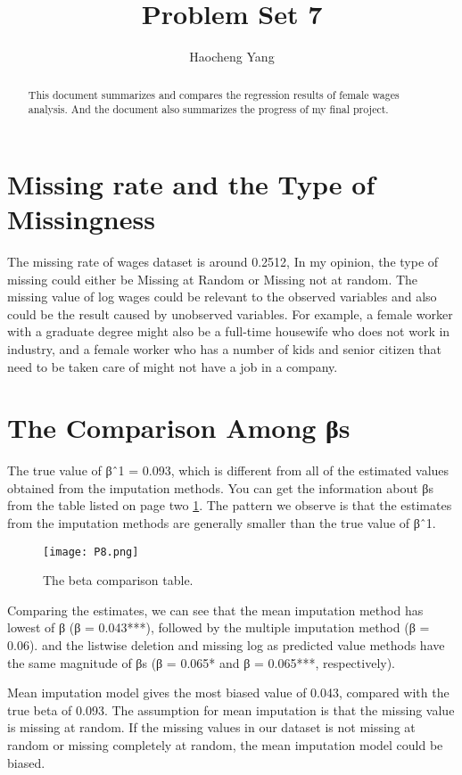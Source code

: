 \documentclass{article}
\title{Problem Set 7}
\author{Haocheng Yang}
\begin{document}
\maketitle

\begin{abstract}
This document summarizes and compares the regression results of female wages analysis. And the document also summarizes the progress of my final project.
\end{abstract}

\section{Missing rate and the Type of Missingness}
The missing rate of wages dataset is around 0.2512, In my opinion, the type of missing could either be Missing at Random or Missing not at random. The missing value of log wages could be relevant to the observed variables and also could be the result caused by unobserved variables. For example, a female worker with a graduate degree might also be a full-time housewife who does not work in industry, and a female worker who has a number of kids and senior citizen that need to be taken care of might not have a job in a company.


\section{The Comparison Among βs}
The true value of βˆ1 = 0.093, which is different from all of the estimated values obtained from the imputation methods. You can get the information about βs from the table listed on page two \ref{fig:P7}. The pattern we observe is that the estimates from the imputation methods are generally smaller than the true value of βˆ1. 

\begin{figure}
\texttt{[image: P8.png]}
\caption{\label{fig:P7} The beta comparison table.}
\end{figure}

Comparing the estimates, we can see that the mean imputation method has lowest of β (β = 0.043***), followed by the multiple imputation method (β = 0.06). and the listwise deletion and missing log as predicted value methods have the same magnitude of βs (β = 0.065* and β = 0.065***, respectively).


Mean imputation model gives the most biased value of 0.043, compared with the true beta of 0.093. The assumption for mean imputation is that the missing value is missing at random. If the missing values in our dataset is not missing at random or missing completely at random, the mean imputation model could be biased.
\end{document}
